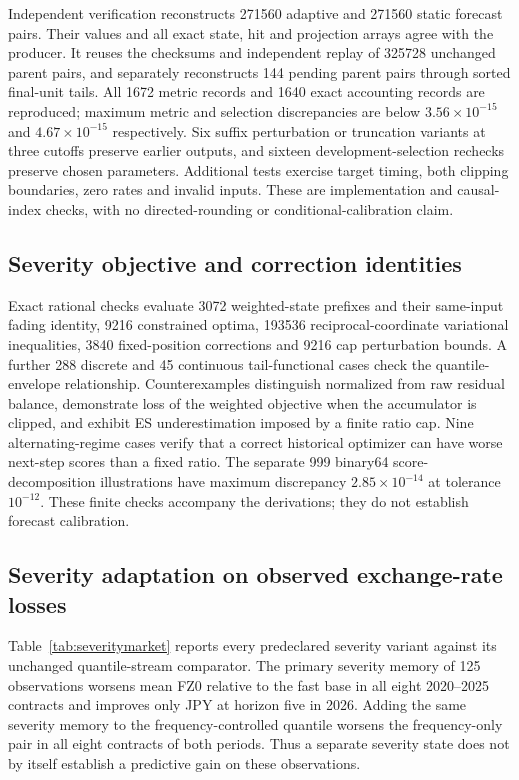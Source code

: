 \documentclass[11pt,a4paper]{article}
\theoremstyle{definition}\newtheorem{definition}[theorem]{Definition}
\begin{document}
Independent verification reconstructs 271560 adaptive and 271560 static forecast pairs. Their values and all exact state, hit and projection arrays agree with the producer. It reuses the checksums and independent replay of 325728 unchanged parent pairs, and separately reconstructs 144 pending parent pairs through sorted final-unit tails. All 1672 metric records and 1640 exact accounting records are reproduced; maximum metric and selection discrepancies are below $3.56\times10^{-15}$ and $4.67\times10^{-15}$ respectively. Six suffix perturbation or truncation variants at three cutoffs preserve earlier outputs, and sixteen development-selection rechecks preserve chosen parameters. Additional tests exercise target timing, both clipping boundaries, zero rates and invalid inputs. These are implementation and causal-index checks, with no directed-rounding or conditional-calibration claim.
\FloatBarrier

\subsection{Severity objective and correction identities}
Exact rational checks evaluate 3072 weighted-state prefixes and their same-input fading identity, 9216 constrained optima, 193536 reciprocal-coordinate variational inequalities, 3840 fixed-position corrections and 9216 cap perturbation bounds. A further 288 discrete and 45 continuous tail-functional cases check the quantile-envelope relationship. Counterexamples distinguish normalized from raw residual balance, demonstrate loss of the weighted objective when the accumulator is clipped, and exhibit ES underestimation imposed by a finite ratio cap. Nine alternating-regime cases verify that a correct historical optimizer can have worse next-step scores than a fixed ratio. The separate 999 binary64 score-decomposition illustrations have maximum discrepancy $2.85\times10^{-14}$ at tolerance $10^{-12}$. These finite checks accompany the derivations; they do not establish forecast calibration.

\subsection{Severity adaptation on observed exchange-rate losses}\label{sec:severitymarketresults}
Table~\ref{tab:severitymarket} reports every predeclared severity variant against its unchanged quantile-stream comparator. The primary severity memory of 125 observations worsens mean FZ0 relative to the fast base in all eight 2020--2025 contracts and improves only JPY at horizon five in 2026. Adding the same severity memory to the frequency-controlled quantile worsens the frequency-only pair in all eight contracts of both periods. Thus a separate severity state does not by itself establish a predictive gain on these observations.
\end{document}
